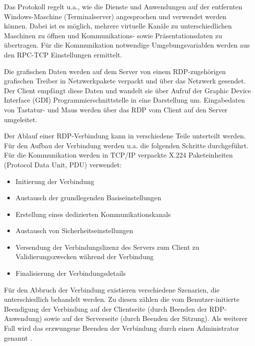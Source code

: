 Das Protokoll regelt u.a., wie die Dienste und Anwendungen auf der entfernten Windows-Maschine (Terminalserver) angesprochen und verwendet werden können. Dabei ist es möglich, mehrere virtuelle Kanäle zu unterschiedlichen Maschinen zu öffnen und Kommunikations- sowie Präsentationsdaten zu übertragen. Für die Kommunikation notwendige Umgebungsvariablen werden aus den RPC-TCP Einstellungen ermittelt. 

Die grafischen Daten werden auf dem Server von einem RDP-zugehörigen grafischen Treiber in Netzwerkpakete verpackt und über das Netzwerk gesendet. Der Client empfängt diese Daten und wandelt sie über Aufruf der Graphic Device Interface (GDI) Programmierschnittstelle in eine Darstellung um. Eingabedaten von Tastatur- und Maus werden über das RDP vom Client auf den Server umgeleitet\citep{RDP1}. 

Der Ablauf einer RDP-Verbindung kann in verschiedene Teile unterteilt werden. Für den Aufbau der Verbindung werden u.a. die folgenden Schritte durchgeführt. Für die Kommunikation werden in TCP/IP verpackte X.224 Paketeinheiten (Protocol Data Unit, PDU) verwendet:
\begin{itemize}
\item Initierung der Verbindung
\item Austausch der grundlegenden Basiseinstellungen
\item Erstellung eines dedizierten Kommunikationskanals
\item Austausch von Sicherheitseinstellungen
\item Versendung der Verbindungslizenz des Servers zum Client zu Validierungszwecken während der Verbindung
\item Finalisierung der Verbindungsdetails
\end{itemize}

Für den Abbruch der Verbindung existieren verschiedene Szenarien, die unterschiedlich behandelt werden. Zu diesen zählen die vom Benutzer-initierte Beendigung der Verbindung auf der Clientseite (durch Beenden der RDP-Anwendung) sowie auf der Serverseite (durch Beenden der Sitzung). Als weiterer Fall wird das erzwungene Beenden der Verbindung durch einen Administrator genannt \citep{RDP2}. 


